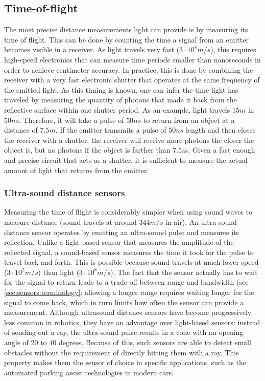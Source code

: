 \subsection{Time-of-flight}

The most precise distance measurements light can provide is by measuring its time of flight. This can be done by counting the time a signal from an emitter becomes visible in a receiver. As light travels very fast ($3\cdot10^8m/s$), this requires high-speed electronics that can measure time periods smaller than nanoseconds in order to achieve centimeter accuracy.
In practice, this is done by combining the receiver with a very fast electronic shutter that operates at the same frequency of the emitted light. As this timing is known, one can infer the time light has traveled by measuring the quantity of photons that made it back from the reflective surface within one shutter period.
As an example, light travels $15m$ in $50ns$. Therefore, it will take a pulse of $50ns$ to return from an object at a distance of $7.5m$. If the emitter transmits a pulse of $50ns$ length and then closes the receiver with a shutter, the receiver will receive more photons the closer the object is, but no photons if the object is farther than $7.5m$. Given a fast enough and precise circuit that acts as a shutter, it is sufficient to measure the actual amount of light that returns from the emitter.

\subsubsection{Ultra-sound distance sensors}
\label{sec:sensors:sound}

Measuring the time of flight is considerably simpler when using sound waves to measure distance (sound travels at around $344m/s$ in air). An ultra-sound distance sensor operates by emitting an ultra-sound pulse and measures its reflection. Unlike a light-based sensor that measures the amplitude of the reflected signal, a sound-based sensor measures the time it took for the pulse to travel back and forth.
This is possible because sound travels at much lower speed ($3\cdot10^2m/s$) than light ($3\cdot10^8m/s$). The fact that the sensor actually has to wait for the signal to return leads to a trade-off between range and bandwidth (see \cref{sec:sensors:terminology}: allowing a longer range requires waiting longer for the signal to come back, which in turn limits how often the sensor can provide a measurement.
Although ultrasound distance sensors have become progressively less common in robotics, they have an advantage over light-based sensors: instead of sending out a ray, the ultra-sound pulse results in a cone with an opening angle of $20$ to $40$ degrees. Because of this, such sensors are able to detect small obstacles without the requirement of directly hitting them with a ray. This property makes them the sensor of choice in specific applications, such as the automated parking assist technologies in modern cars.



